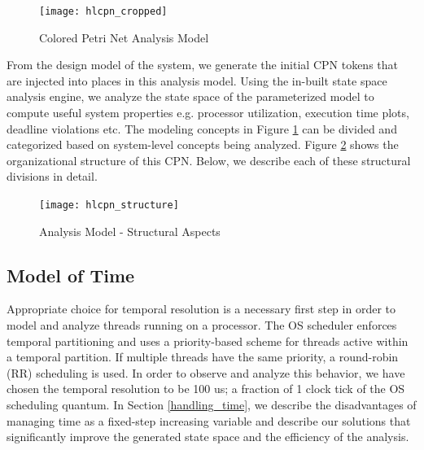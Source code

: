\begin{figure}[h]
	\centering
	\texttt{[image: hlcpn\_cropped]}
	\caption{Colored Petri Net Analysis Model}
	\label{fig:hlcpn}
\end{figure}

From the design model of the system, we generate the initial CPN tokens that are injected into places in this analysis model. Using the in-built state space analysis engine, we analyze the state space of the parameterized model to compute useful system properties e.g. processor utilization, execution time plots, deadline violations etc. The modeling concepts in Figure \ref{fig:hlcpn} can be divided and categorized based on system-level concepts being analyzed. Figure \ref{fig:hlcpn_structure} shows the organizational structure of this CPN. Below, we describe each of these structural divisions in detail. 

\begin{figure}[h]
	\centering
	\texttt{[image: hlcpn\_structure]}
	\caption{Analysis Model - Structural Aspects}
	\label{fig:hlcpn_structure}
\end{figure}

\subsection{Model of Time}
\label{sec:model_of_time}

Appropriate choice for temporal resolution is a necessary first step in order to model and analyze threads running on a processor. The OS scheduler enforces temporal partitioning and uses a priority-based scheme for threads active within a temporal partition. If multiple threads have the same priority, a round-robin (RR) scheduling is used. In order to observe and analyze this behavior, we have chosen the temporal resolution to be 100 us; a fraction of 1 clock tick of the OS scheduling quantum. In Section \ref{handling_time}, we describe the disadvantages of managing time as a fixed-step increasing variable and describe our solutions that significantly improve the generated state space and the efficiency of the analysis. 


